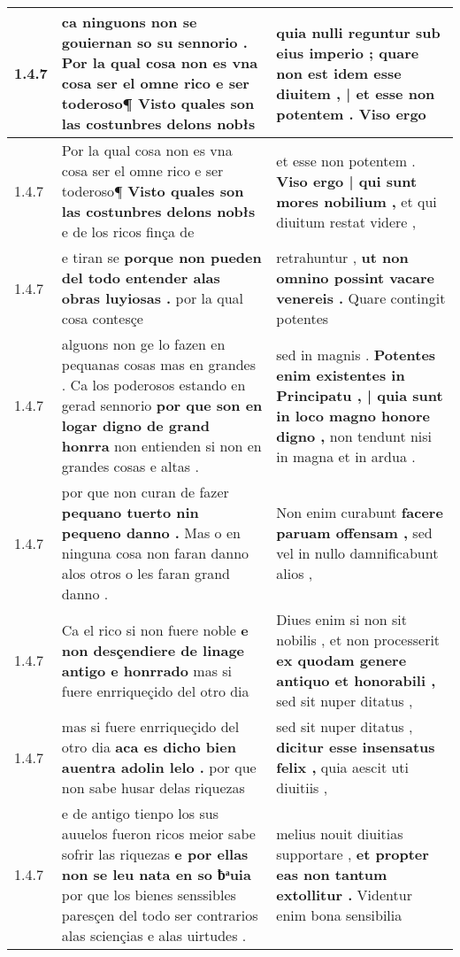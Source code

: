 \begin{tabular}{|p{1cm}|p{6.5cm}|p{6.5cm}|}
1.4.7 & ca ninguons non se gouiernan so su sennorio . \textbf{ Por la qual cosa non es vna cosa ser el omne rico e ser toderoso¶ } Visto quales son las costunbres delons nobłs & quia nulli reguntur sub eius imperio ; \textbf{ quare non est idem esse diuitem , | et esse non potentem . } Viso ergo \\\hline
1.4.7 & Por la qual cosa non es vna cosa ser el omne rico e ser toderoso¶ \textbf{ Visto quales son las costunbres delons nobłs } e de los ricos finça de & et esse non potentem . \textbf{ Viso ergo | qui sunt mores nobilium , } et qui diuitum restat videre , \\\hline
1.4.7 & e tiran se \textbf{ porque non pueden del todo entender alas obras luyiosas . } por la qual cosa contesçe & retrahuntur , \textbf{ ut non omnino possint vacare venereis . } Quare contingit potentes \\\hline
1.4.7 & alguons non ge lo fazen en pequanas cosas mas en grandes . Ca los poderosos estando en gerad sennorio \textbf{ por que son en logar digno de grand honrra } non entienden si non en grandes cosas e altas . & sed in magnis . \textbf{ Potentes enim existentes in Principatu , | quia sunt in loco magno honore digno , } non tendunt nisi in magna et in ardua . \\\hline
1.4.7 & por que non curan de fazer \textbf{ pequano tuerto nin pequeno danno . } Mas o en ninguna cosa non faran danno alos otros o les faran grand danno . & Non enim curabunt \textbf{ facere paruam offensam , } sed vel in nullo damnificabunt alios , \\\hline
1.4.7 & Ca el rico si non fuere noble \textbf{ e non desçendiere de linage antigo e honrrado } mas si fuere enrriqueçido del otro dia & Diues enim si non sit nobilis , et non processerit \textbf{ ex quodam genere antiquo et honorabili , } sed sit nuper ditatus , \\\hline
1.4.7 & mas si fuere enrriqueçido del otro dia \textbf{ aca es dicho bien auentra adolin lelo . } por que non sabe husar delas riquezas & sed sit nuper ditatus , \textbf{ dicitur esse insensatus felix , } quia aescit uti diuitiis , \\\hline
1.4.7 & e de antigo tienpo los sus auuelos fueron ricos meior sabe sofrir las riquezas \textbf{ e por ellas non se leu nata en so ƀͣuia } por que los bienes senssibles paresçen del todo ser contrarios alas sciençias e alas uirtudes . & melius nouit diuitias supportare , \textbf{ et propter eas non tantum extollitur . } Videntur enim bona sensibilia \\\hline

\end{tabular}
